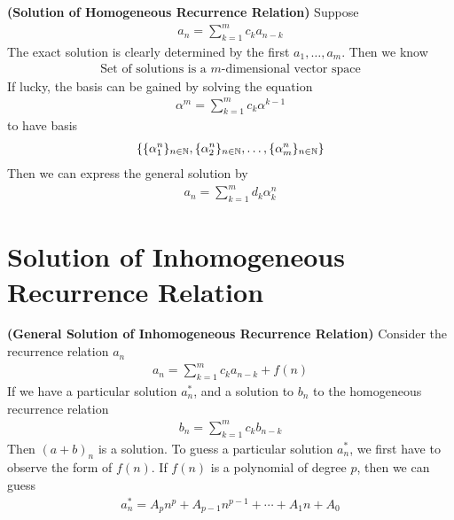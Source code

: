 \documentclass{report}
\begin{document}
\begin{corollary}
\textbf{(Solution of Homogeneous Recurrence Relation)} Suppose 
\begin{align*}
a_n=\sum_{k=1}^m c_ka_{n-k}
\end{align*}
The exact solution is clearly determined by the first $a_1,\dots ,a_m$. Then we know 
\begin{align*}
\text{ Set of solutions is a $m$-dimensional vector space }
\end{align*}
If lucky, the basis can be gained by solving the equation 
\begin{align*}
\alpha^m=\sum_{k=1}^{m}c_k\alpha^{k-1}
\end{align*}
to have basis 
\begin{align*}
\{ \{ \alpha_1^n \}_{n\in\mathbb{N}},\{ \alpha _2^n \}_{n\in\mathbb{N}},\dots ,\{ \alpha _m^n \}_{n\in\mathbb{N}} \}
\end{align*}
Then we can express the general solution by 
\begin{align*}
a_n=\sum_{k=1}^m d_k \alpha_k^n
\end{align*}
\end{corollary}
\section{Solution of Inhomogeneous Recurrence Relation}
\begin{theorem}
\textbf{(General Solution of Inhomogeneous Recurrence Relation)} Consider the recurrence relation $a_n$ 
 \begin{align*}
a_n=\sum_{k=1}^m c_ka_{n-k} +f(n)
\end{align*}
If we have a particular solution $a_n^*$, and a solution to  $b_n$ to the homogeneous recurrence relation 
 \begin{align*}
b_n=\sum_{k=1}^m c_kb_{n-k}
\end{align*}
Then $(a+b)_n$ is a solution. To guess a particular solution $a_n^*$, we first have to observe the form of  $f(n)$. If $f(n)$ is a polynomial of degree $p$, then we can guess 
\begin{align*}
a_n^*=A_pn^p+A_{p-1}n^{p-1}+\cdots +A_1n+A_0
\end{align*}
\end{theorem}
\end{document}

